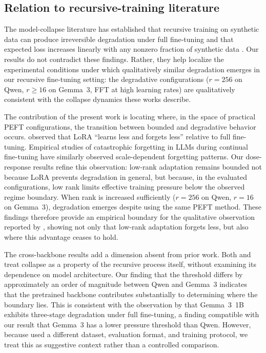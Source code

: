 \documentclass[a4paper,fleqn]{cas-dc}
\begin{document}
\subsection{Relation to recursive-training literature}\label{sec:disc_literature}

The model-collapse literature has established that recursive training on
synthetic data can produce irreversible degradation under full fine-tuning
\citep{shumailov2024} and that expected loss increases linearly with any
nonzero fraction of synthetic data \citep{dohmatob2025}. Our results do not
contradict these findings. Rather, they help localize the experimental
conditions under which qualitatively similar degradation emerges in our
recursive fine-tuning setting: the degradative configurations ($r=256$ on Qwen,
$r \geq 16$ on Gemma~3, FFT at high learning rates) are qualitatively
consistent with the collapse dynamics these works describe.

The contribution of the present work is locating where, in the space of
practical PEFT configurations, the transition between bounded and degradative
behavior occurs. \citet{biderman2024} observed that LoRA ``learns less and
forgets less'' relative to full fine-tuning. Empirical studies of catastrophic
forgetting in LLMs during continual fine-tuning \citep{luo2023empirical} have
similarly observed scale-dependent forgetting patterns. Our dose-response results
refine
this observation: low-rank adaptation remains bounded not because LoRA prevents
degradation in general, but because, in the evaluated configurations, low rank
limits effective training pressure below the observed regime boundary. When rank
is increased sufficiently ($r=256$ on Qwen, $r=16$ on Gemma~3), degradation
emerges despite using the same PEFT method. These findings therefore
provide an empirical boundary for the qualitative observation reported by
\citet{biderman2024}, showing not only that low-rank adaptation forgets less,
but also where this advantage ceases to hold.

The cross-backbone results add a dimension absent from prior work. Both
\citet{shumailov2024} and \citet{dohmatob2025} treat collapse as a property of
the recursive process itself, without examining its dependence on model
architecture. Our finding that the threshold differs by approximately an order
of magnitude between Qwen and Gemma~3 indicates that the pretrained backbone
contributes substantially to determining where the boundary lies. This
is consistent with the observation by \citet{keisha2025} that Gemma~3~1B
exhibits three-stage degradation under full fine-tuning, a finding compatible
with our result that Gemma~3 has a lower pressure threshold than Qwen. However,
because \citet{keisha2025} used a different dataset, evaluation format, and
training protocol, we treat this as suggestive context rather than a controlled
comparison.
\end{document}

